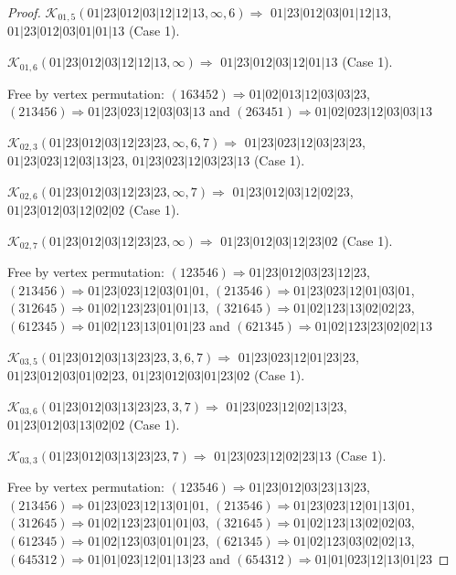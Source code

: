 \documentclass[12pt]{article}
\theoremstyle{plain}
\theoremstyle{definition}
\theoremstyle{remark}
\newcommand{\fancy}[1]{\mathcal{#1}}
\def\K{\fancy{K}}
\begin{document}
\begin{proof}
	$\K_{01,5}(01|23|012|03|12|12|13,\infty,6)\Rightarrow $ $01|23|012|03|01|12|13$, $01|23|012|03|01|01|13$ (Case 1).
	
	$\K_{01,6}(01|23|012|03|12|12|13,\infty)\Rightarrow $ $01|23|012|03|12|01|13$ (Case 1).
	
	
	
	Free by vertex permutation: $(1 6 3 4 5 2)\Rightarrow 01|02|013|12|03|03|23$, $(2 1 3 4 5 6)\Rightarrow 01|23|023|12|03|03|13$ and $(2 6 3 4 5 1)\Rightarrow 01|02|023|12|03|03|13$
	
	
	
	\bigskip
	
	$\K_{02,3}(01|23|012|03|12|23|23,\infty,6, 7)\Rightarrow $ $01|23|023|12|03|23|23$, $01|23|023|12|03|13|23$, $01|23|023|12|03|23|13$ (Case 1).
	
	$\K_{02,6}(01|23|012|03|12|23|23,\infty,7)\Rightarrow $ $01|23|012|03|12|02|23$, $01|23|012|03|12|02|02$ (Case 1).
	
	$\K_{02,7}(01|23|012|03|12|23|23,\infty)\Rightarrow $ $01|23|012|03|12|23|02$ (Case 1).
	
	
	
	Free by vertex permutation: $(1 2 3 5 4 6)\Rightarrow 01|23|012|03|23|12|23$, $(2 1 3 4 5 6)\Rightarrow 01|23|023|12|03|01|01$, $(2 1 3 5 4 6)\Rightarrow 01|23|023|12|01|03|01$, $(3 1 2 6 4 5)\Rightarrow 01|02|123|23|01|01|13$, $(3 2 1 6 4 5)\Rightarrow 01|02|123|13|02|02|23$, $(6 1 2 3 4 5)\Rightarrow 01|02|123|13|01|01|23$ and $(6 2 1 3 4 5)\Rightarrow 01|02|123|23|02|02|13$
	
	
	
	\bigskip
	
	$\K_{03,5}(01|23|012|03|13|23|23,3, 6, 7)\Rightarrow $ $01|23|023|12|01|23|23$, $01|23|012|03|01|02|23$, $01|23|012|03|01|23|02$ (Case 1).
	
	$\K_{03,6}(01|23|012|03|13|23|23,3, 7)\Rightarrow $ $01|23|023|12|02|13|23$, $01|23|012|03|13|02|02$ (Case 1).
	
	$\K_{03,3}(01|23|012|03|13|23|23,7)\Rightarrow $ $01|23|023|12|02|23|13$ (Case 1).
	
	
	
	Free by vertex permutation: $(1 2 3 5 4 6)\Rightarrow 01|23|012|03|23|13|23$, $(2 1 3 4 5 6)\Rightarrow 01|23|023|12|13|01|01$, $(2 1 3 5 4 6)\Rightarrow 01|23|023|12|01|13|01$, $(3 1 2 6 4 5)\Rightarrow 01|02|123|23|01|01|03$, $(3 2 1 6 4 5)\Rightarrow 01|02|123|13|02|02|03$, $(6 1 2 3 4 5)\Rightarrow 01|02|123|03|01|01|23$, $(6 2 1 3 4 5)\Rightarrow 01|02|123|03|02|02|13$, $(6 4 5 3 1 2)\Rightarrow 01|01|023|12|01|13|23$ and $(6 5 4 3 1 2)\Rightarrow 01|01|023|12|13|01|23$
	

\end{proof}
\end{document}
